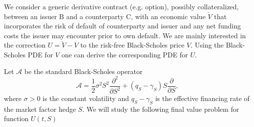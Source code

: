\documentclass[a4paper,10pt]{article}
\newcommand{\1}{\mathbf{1}}
\begin{document}
We consider a generic derivative contract (e.g. option), possibly collateralized, between an issuer $\text{B}$ and a counterparty $\text{C}$, with an economic value $\check{V}$ that incorporates the risk of default of counterparty and issuer and any net funding costs the issuer may encounter prior to own default. We are mainly interested in the correction $U=\check{V}-V$ to the risk-free Black-Scholes price $V$. Using the Black-Scholes PDE for $V$ one can derive \citep{BurgardKjaer13} the corresponding PDE for $U$.

Let $\mathcal{A}$ be the standard Black-Scholes operator
\begin{equation}
\mathcal{A} = \frac{1}{2}\sigma^2 S^2 \frac{\partial^2}{\partial S^2}+(q_S-\gamma_S)S \frac{\partial}{\partial S},
\end{equation}
where $\sigma>0$ is the constant volatility and $q_S-\gamma_S$ is the effective financing rate of the market factor hedge $S$. We will study the following final value problem for function $U(t,S)$
\end{document}
